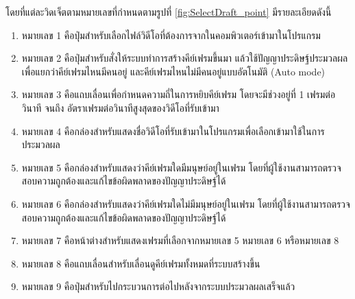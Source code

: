 โดยที่แต่ละวิดเจ็ตตามหมายเลขที่กำหนดตามรูปที่ \ref{fig:SelectDraft_point} มีรายละเอียดดังนี้
\begin{enumerate}
	\setlength\itemsep{-0.25em}
	\item หมายเลข 1 คือปุ่มสำหรับเลือกไฟล์วิดีโอที่ต้องการจากในคอมพิวเตอร์เข้ามาในโปรแกรม
    \item หมายเลข 2 คือปุ่มสำหรับสั่งให้ระบบทำการสร้างคีย์เฟรมขึ้นมา แล้วใช้ปัญญาประดิษฐ์ประมวลผลเพื่อแยกว่าคีย์เฟรมไหนมีคนอยู่ และคีย์เฟรมไหนไม่มีคนอยู่แบบอัตโนมัติ (Auto mode)
    \item หมายเลข 3 คือแถบเลื่อนเพื่อกำหนดความถี่ในการหยิบคีย์เฟรม โดยจะมีช่วงอยู่ที่ 1 เฟรมต่อวินาที จนถึง อัตราเฟรมต่อวินาทีสูงสุดของวิดีโอที่รับเข้ามา
	\item หมายเลข 4 คือกล่องสำหรับแสดงชื่อวิดีโอที่รับเข้ามาในโปรแกรมเพื่อเลือกเข้ามาใช้ในการประมวลผล
	\item หมายเลข 5 คือกล่องสำหรับแสดงว่าคีย์เฟรมใดมีมนุษย์อยู่ในเฟรม โดยที่ผู้ใช้งานสามารถตรวจสอบความถูกต้องและแก้ไขข้อผิดพลาดของปัญญาประดิษฐ์ได้
	\item หมายเลข 6 คือกล่องสำหรับแสดงว่าคีย์เฟรมใดไม่มีมนุษย์อยู่ในเฟรม โดยที่ผู้ใช้งานสามารถตรวจสอบความถูกต้องและแก้ไขข้อผิดพลาดของปัญญาประดิษฐ์ได้
	\item หมายเลข 7 คือหน้าต่างสำหรับแสดงเฟรมที่เลือกจากหมายเลข 5 หมายเลข 6 หรือหมายเลข 8
	\item หมายเลข 8 คือแถบเลื่อนสำหรับเลื่อนดูคีย์เฟรมทั้งหมดที่ระบบสร้างขึ้น
	\item หมายเลข 9 คือปุ่มสำหรับไปกระบวนการต่อไปหลังจากระบบประมวลผลเสร็จแล้ว
\end{enumerate}
\clearpage

